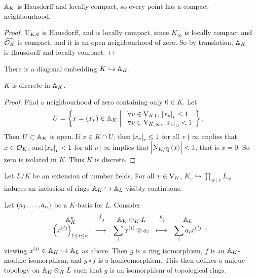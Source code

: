 \pagebreak

\begin{proposition}
$ \AA_K $ is Hausdorff and locally compact, so every point has a compact neighbourhood.
\end{proposition}

\begin{proof}
$ \U_{K, \emptyset} $ is Hausdorff, and is locally compact, since $ K_\infty $ is locally compact and $ \widehat{\OOO_K} $ is compact, and it is an open neighbourhood of zero. So by translation, $ \AA_K $ is Hausdorff and locally compact.
\end{proof}

There is a diagonal embedding $ K \hookrightarrow \AA_K $.

\begin{proposition}
$ K $ is discrete in $ \AA_K $.
\end{proposition}

\begin{proof}
Find a neighbourhood of zero containing only $ 0 \in K $. Let
$$ U = \cbr{x = \br{x_v} \in \AA_K \st \begin{array}{l} \forall v \in \V_{K, \f}, \ \abs{x_v}_v \le 1 \\ \forall v \in \V_{K, \infty}, \ \abs{x_v}_v < 1 \end{array}}. $$
Then $ U \subset \AA_K $ is open. If $ x \in K \cap U $, then $ \abs{x_v}_v \le 1 $ for all $ v \nmid \infty $ implies that $ x \in \OOO_K $, and $ \abs{x_v}_v < 1 $ for all $ v \mid \infty $ implies that $ \abs{\N_{K / \QQ}\br{x}} < 1 $, that is $ x = 0 $. So zero is isolated in $ K $. Thus $ K $ is discrete.
\end{proof}


Let $ L / K $ be an extension of number fields. For all $ v \in \V_K $, $ K_v \hookrightarrow \prod_{w \mid v} L_w $ induces an inclusion of rings $ \AA_K \hookrightarrow \AA_L $ visibly continuous.

\begin{proposition}
\label{prop:6.3}
Let $ \br{a_1, \dots, a_n} $ be a $ K $-basis for $ L $. Consider
$$
\begin{array}{ccccc}
\AA_K^n & \xrightarrow{f} & \AA_K \otimes_K L & \xrightarrow{g} & \AA_L \\
\displaystyle\br{x^{\br{i}}}_{1 \le i \le n} & \longmapsto & \displaystyle\sum_i x^{\br{i}} \otimes a_i & \longmapsto & \displaystyle\sum_i a_ix^{\br{i}}
\end{array},
$$
viewing $ x^{\br{i}} \in \AA_K \hookrightarrow \AA_L $ as above. Then $ g $ is a ring isomorphism, $ f $ is an $ \AA_K $-module isomorphism, and $ g \circ f $ is a homeomorphism. This then defines a unique topology on $ \AA_K \otimes_K L $ such that $ g $ is an isomorphism of topological rings.
\end{proposition}


